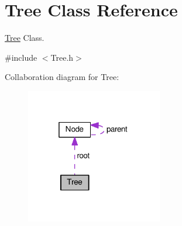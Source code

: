 \hypertarget{class_tree}{\section{Tree Class Reference}
\label{class_tree}
}


\hyperlink{class_tree}{Tree} Class.  




{\ttfamily \#include $<$Tree.\-h$>$}



Collaboration diagram for Tree\-:
\nopagebreak
\begin{figure}[H]
\begin{center}
\leavevmode
\includegraphics[width=169pt]{class_tree__coll__graph}
\end{center}
\end{figure}
